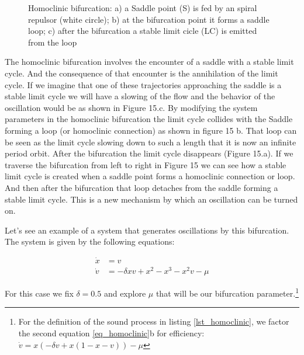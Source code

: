 \documentclass{article}
\begin{document}
\begin{figure}[h]
    \centering
    \caption{Homoclinic bifurcation: a) a Saddle point (S) is fed by an spiral repulsor (white circle); b) at the bifurcation point it forms a saddle loop; c) after the bifurcation a stable limit cicle (LC) is emitted from the loop} 
    \label{fig_homoclinic}
\end{figure}

The homoclinic bifurcation involves the encounter of a saddle with a stable limit cycle. 
And the consequence of that encounter is the annihilation of the limit cycle. 
If we imagine that one of these trajectories approaching the saddle is a stable limit cycle we will have a slowing of the flow and the behavior of the oscillation would be as shown in Figure 15.c. 
By modifying the system parameters in the homoclinic bifurcation the limit cycle collides with the Saddle forming a loop (or homoclinic connection) as shown in figure 15 b. 
That loop can be seen as the limit cycle slowing down to such a length that it is now an infinite period orbit. After the bifurcation the limit cycle disappears (Figure 15.a).
If we traverse the bifurcation from left to right in Figure 15 we can see how a stable limit cycle is created when a saddle point forms a homoclinic connection or loop. And then after the bifurcation that loop detaches from the saddle forming a stable limit cycle. This is a new mechanism by which an oscillation can be turned on.

Let's see an example of a system that generates oscillations by this bifurcation. The system is given by the following equations:

\begin{subequations} \label{eq_homoclinic}
\begin{align}
    \dot{x} & = v \\
    \dot{v} & = - \delta xv + x^2 - x^3 -x^2v - \mu
\end{align}
\end{subequations}

For this case we fix $\delta=0.5$ and explore $\mu$ that will be our bifurcation parameter.\footnote{For the definition of the sound process in listing \ref{lst_homoclinic}, we factor the second equation \ref{eq_homoclinic}b for efficiency: $\dot{v} = x (- \delta v + x (1 - x - v)) - \mu$}
\end{document}
